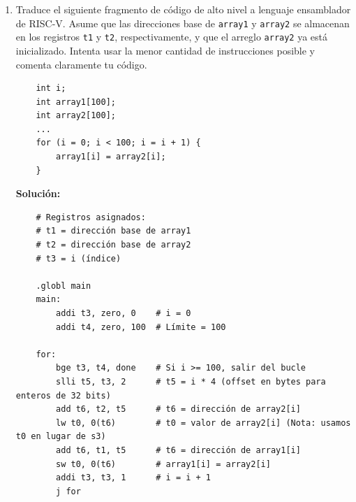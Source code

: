 \documentclass[letterpaper,12pt]{article}
\begin{document}
\begin{enumerate}
\begin{enumerate}[label=\alph*)]
        \item \texttt{0x0000006F} $\rightarrow$ \texttt{00000000000000000000\_00000\_1101111}
        \begin{itemize}[noitemsep]
            \item \texttt{opcode = 1101111} (Formato Tipo J - \texttt{jal})
            \item \texttt{rd = 00000} (x0 $\rightarrow$ \texttt{zero})
            \item \texttt{imm[20|10:1|11|19:12] = 0} (Inmediato / Offset = 0)
        \end{itemize}
        Instrucción decodificada: \textbf{\texttt{jal zero, 0}} (equivalente a la pseudoinstrucción de salto incondicional infinito: \textbf{\texttt{j .}})
    \end{enumerate}
    \color{black}

    \vspace{0.5cm}
    \pagebreak

    \item Traduce el siguiente fragmento de código de alto nivel a lenguaje ensamblador de RISC-V. Asume que las direcciones base de \texttt{array1} y \texttt{array2} se almacenan en los registros \texttt{t1} y \texttt{t2}, respectivamente, y que el arreglo \texttt{array2} ya está inicializado. Intenta usar la menor cantidad de instrucciones posible y comenta claramente tu código.
    \begin{verbatim}
    int i;
    int array1[100];
    int array2[100];
    ...
    for (i = 0; i < 100; i = i + 1) {
        array1[i] = array2[i];
    }
    \end{verbatim}

    \color{solcolor}
    \textbf{Solución:}
    \begin{verbatim}
    # Registros asignados:
    # t1 = dirección base de array1
    # t2 = dirección base de array2
    # t3 = i (índice)

    .globl main
    main:
        addi t3, zero, 0    # i = 0
        addi t4, zero, 100  # Límite = 100
        
    for:   
        bge t3, t4, done    # Si i >= 100, salir del bucle
        slli t5, t3, 2      # t5 = i * 4 (offset en bytes para enteros de 32 bits)
        add t6, t2, t5      # t6 = dirección de array2[i]
        lw t0, 0(t6)        # t0 = valor de array2[i] (Nota: usamos t0 en lugar de s3)
        add t6, t1, t5      # t6 = dirección de array1[i]
        sw t0, 0(t6)        # array1[i] = array2[i]
        addi t3, t3, 1      # i = i + 1
        j for
        

\end{verbatim}
\end{enumerate}
\end{document}
